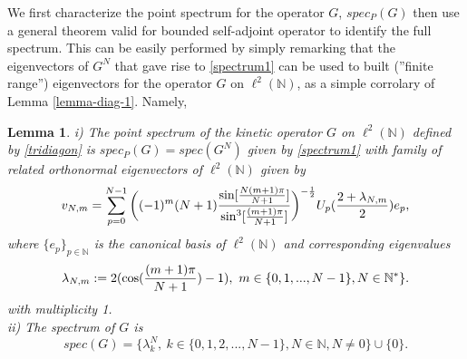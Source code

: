\documentclass[a4paper]{jpconf}
\numberwithin{equation}{section}
\newtheorem{lemma}[Theorem]{Lemma}
\theoremstyle{nonumberplain}
\begin{document}
We first characterize the point spectrum for the operator $G$, $spec_P(G)$ then use a general theorem valid for bounded self-adjoint operator to identify the full spectrum. This can be easily performed by simply remarking that the eigenvectors of $G^N$ that gave rise to \eqref{spectrum1} can be used to built (''finite range'') eigenvectors for the operator $G$ on $\ell^2(\mathbb{N})$, as a simple corrolary of Lemma \ref{lemma-diag-1}. Namely, 
\begin{lemma}\label{lemma-spectrum-full}
i) The point spectrum of the kinetic operator $G$ on $\ell^2(\mathbb{N})$ defined by \eqref{tridiagon} is $spec_P(G)=spec(G^N)$ given by \eqref{spectrum1} with family of related orthonormal eigenvectors of $\ell^2(\mathbb{N})$ given by 
\begin{equation}
v_{N,m}=\sum_{p=0}^{N-1}\bigg((-1)^m(N+1){{ \sin[{{N(m+1)\pi }\over{N+1 }}  ]}\over {\sin^3[{{(m+1)\pi }\over{N+1 }} ] }} \bigg)^{-{{1}\over{2}}}  U_p({{2+\lambda_{N,m}}\over{2}})e_p\label{eigenvektor},
\end{equation}
where $\{e_p\}_{p\in\mathbb{N}}$ is the canonical basis of $\ell^2(\mathbb{N})$ and corresponding eigenvalues
\begin{equation}
\lambda_{N,m}:=2(\cos({{(m+1)\pi}\over{N+1}})-1), \ m\in\{0,1,...,N-1\}, N\in\mathbb{N}^*\}.
\end{equation}
with multiplicity 1.\\
ii) The spectrum of $G$ is 
\begin{equation}
spec(G)=\{\lambda^N_k,\ k\in\{0,1,2,...,N-1\}, N\in\mathbb{N}, N\ne0 \}\cup\{0\}\label{spectrum-full}.
\end{equation}
\end{lemma}
\end{document}
